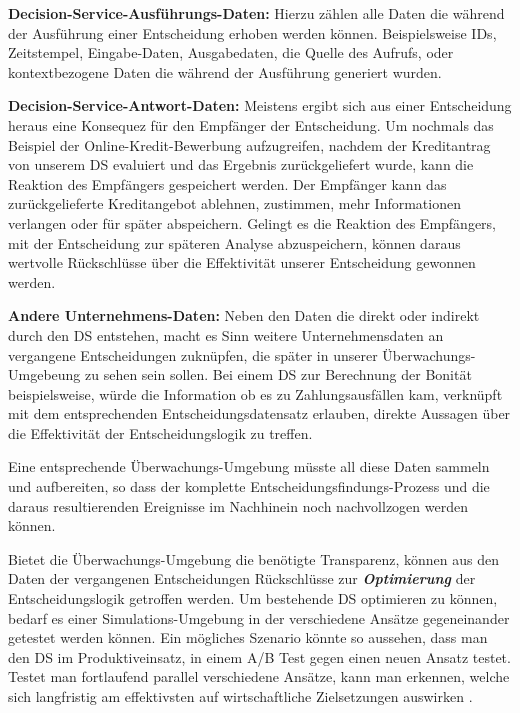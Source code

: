 \begin{enumerate*}
\item \textbf{Decision-Service-Ausführungs-Daten:} Hierzu zählen alle Daten die während der Ausführung einer Entscheidung erhoben werden können. Beispielsweise IDs, Zeitstempel, Eingabe-Daten, Ausgabedaten, die Quelle des Aufrufs, oder kontextbezogene Daten die während der Ausführung generiert wurden.   
\item \textbf{Decision-Service-Antwort-Daten:} Meistens ergibt sich aus einer Entscheidung heraus eine Konsequez für den Empfänger der Entscheidung. Um nochmals das Beispiel der Online-Kredit-Bewerbung aufzugreifen, nachdem der Kreditantrag von unserem DS evaluiert und das Ergebnis zurückgeliefert wurde, kann die Reaktion des Empfängers gespeichert werden. Der Empfänger kann das zurückgelieferte Kreditangebot ablehnen, zustimmen, mehr Informationen verlangen oder für später abspeichern. Gelingt es die Reaktion des Empfängers, mit der Entscheidung zur späteren Analyse abzuspeichern, können daraus wertvolle Rückschlüsse über die Effektivität unserer Entscheidung gewonnen werden.     
\item \textbf{Andere Unternehmens-Daten:} Neben den Daten die direkt oder indirekt durch den DS entstehen, macht es Sinn weitere Unternehmensdaten an vergangene Entscheidungen zuknüpfen, die später in unserer Überwachungs-Umgebeung zu sehen sein sollen. Bei einem DS zur Berechnung der Bonität beispielsweise, würde die Information ob es zu Zahlungsausfällen kam, verknüpft mit dem entsprechenden Entscheidungsdatensatz erlauben, direkte Aussagen über die Effektivität der Entscheidungslogik zu treffen.       
\end{enumerate*}         

Eine entsprechende Überwachungs-Umgebung müsste all diese Daten sammeln und aufbereiten, so dass der komplette Entscheidungsfindungs-Prozess und die daraus resultierenden Ereignisse im Nachhinein noch nachvollzogen werden können.

Bietet die Überwachungs-Umgebung die benötigte Transparenz, können aus den Daten der vergangenen Entscheidungen Rückschlüsse zur \textbf{\textit{Optimierung}} der Entscheidungslogik getroffen werden. Um bestehende DS optimieren zu können, bedarf es einer Simulations-Umgebung in der verschiedene Ansätze gegeneinander getestet werden können. Ein mögliches Szenario könnte so aussehen, dass man den DS im Produktiveinsatz, in einem A/B Test gegen einen neuen Ansatz testet. Testet man fortlaufend parallel verschiedene Ansätze, kann man erkennen, welche sich langfristig am effektivsten auf wirtschaftliche Zielsetzungen auswirken \cite[vgl. S. 173]{JT11}. 

